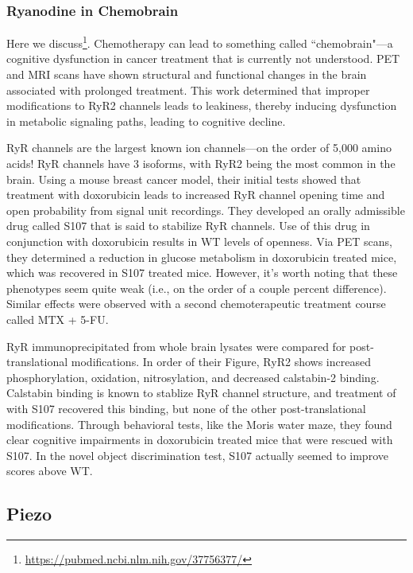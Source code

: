\subsubsection{Ryanodine in Chemobrain}

Here we discuss\footnote{\url{https://pubmed.ncbi.nlm.nih.gov/37756377/}}. Chemotherapy can lead to something called ``chemobrain"---a cognitive dysfunction in cancer treatment that is currently not understood. PET and MRI scans have shown structural and functional changes in the brain associated with prolonged treatment. This work determined that improper modifications to RyR2 channels leads to leakiness, thereby inducing dysfunction in metabolic signaling paths, leading to cognitive decline.\newline

RyR channels are the largest known ion channels---on the order of 5,000 amino acids! RyR channels have 3 isoforms, with RyR2 being the most common in the brain. Using a mouse breast cancer model, their initial tests showed that treatment with doxorubicin leads to increased RyR channel opening time and open probability from signal unit recordings. They developed an orally admissible drug called S107 that is said to stabilize RyR channels. Use of this drug in conjunction with doxorubicin results in WT levels of openness. Via PET scans, they determined a reduction in glucose metabolism in doxorubicin treated mice, which was recovered in S107 treated mice. However, it's worth noting that these phenotypes seem quite weak (i.e., on the order of a couple percent difference). Similar effects were observed with a second chemoterapeutic treatment course called MTX + 5-FU.\newline

RyR immunoprecipitated from whole brain lysates were compared for post-translational modifications. In order of their Figure, RyR2 shows increased phosphorylation, oxidation, nitrosylation, and decreased calstabin-2 binding. Calstabin binding is known to stablize RyR channel structure, and treatment of with S107 recovered this binding, but none of the other post-translational modifications. Through behavioral tests, like the Moris water maze, they found clear cognitive impairments in doxorubicin treated mice that were rescued with S107. In the novel object discrimination test, S107 actually seemed to improve scores above WT. 


\subsection{Piezo}

